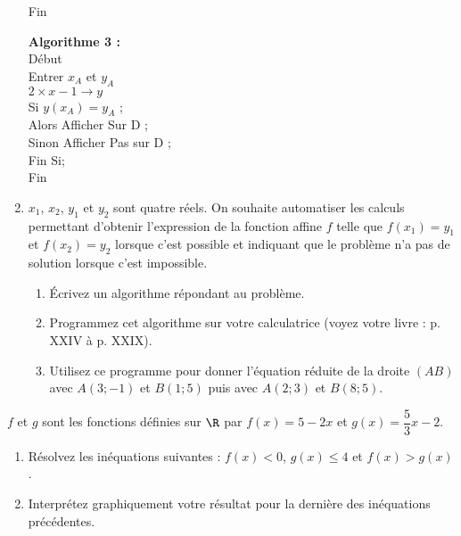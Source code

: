 \begin{exr}
\begin{enumerate}
{\begin{minipage}[c]{0.31\linewidth}
    Fin
    \end{minipage}
  \hfill\vline\hfill
    \begin{minipage}[c]{0.31\linewidth}
    \textbf{Algorithme 3 :}	\\
    \noindent Début  \\
    \hspace*{0.5cm} Entrer $x_A$ et $y_A$\\
    \hspace*{0.5cm}  $2\times x -1 \rightarrow y$ \\
    \hspace*{0.5cm} Si $y(x_A)=y_A$ ;\\
    \hspace*{1cm} Alors Afficher \og Sur D \fg;\\
    \hspace*{1cm} Sinon Afficher \og Pas sur D \fg;\\
    \hspace*{0.5cm} Fin Si; \\
    Fin
    \end{minipage}
  }
  
\vspace*{1ex}
  \item $x_1$, $x_2$, $y_1$ et $y_2$ sont quatre réels. On souhaite automatiser les calculs permettant d'obtenir l'expression de la fonction affine $f$ telle que $f(x_1)=y_1$ et $f(x_2)=y_2$ lorsque c'est possible et indiquant que le problème n'a pas de solution lorsque c'est impossible.
    \begin{enumerate}
    \item Écrivez un algorithme répondant au problème.
    \item Programmez cet algorithme sur votre calculatrice (voyez votre livre : p. XXIV à p. XXIX).
    \item Utilisez ce programme pour donner l'équation réduite de la droite $(AB)$ avec $A(3 ; -1)$ et $B(1 ; 5)$ puis avec  $A(2 ; 3)$ et $B(8 ; 5)$.
    \end{enumerate}
  \end{enumerate}
\end{exr}
%
%
%
\begin{exr} $f$ et $g$ sont les fonctions définies sur $\R$ par $f(x)=5-2x$ et $g(x)=\dfrac{5}{3}x-2$.
  \begin{enumerate}
  \item  Résolvez  les inéquations suivantes : $f(x)< 0$, $g(x)\leqslant 4$ et $f(x)>g(x)$.
  \item Interprétez graphiquement votre résultat pour la dernière des inéquations précédentes.
  \end{enumerate}
\end{exr}
